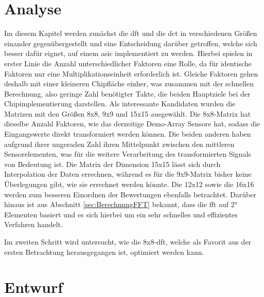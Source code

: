  
 
 
 
 
\chapter{Analyse}
Im diesem Kapitel werden zunächst die \gls{dft} und die \gls{dct} in verschiedenen Größen einander gegenübergestellt und eine Entscheidung darüber getroffen, welche
sich besser dafür eignet, auf einem \gls{asic} implementiert zu werden. Hierbei spielen in erster Linie die Anzahl unterschiedlicher Faktoren eine Rolle, 
da für identische Faktoren nur eine Multiplikationseinheit erforderlich ist. Gleiche Faktoren gehen deshalb mit einer kleineren Chipfläche einher, was zusammen mit der schnellen 
Berechnung, also geringe Zahl benötigter Takte, die beiden Hauptziele bei der Chipimplementierung darstellen.
Als interessante Kandidaten wurden die Matrizen mit den Größen 8x8, 9x9 und 15x15 ausgewählt. 
Die 8x8-Matrix hat dieselbe Anzahl Faktoren, wie das derzeitige Demo-Array Sensore hat, sodass die Eingangswerte direkt transformiert werden können. 
Die beiden anderen haben aufgrund ihrer ungeraden Zahl ihren Mittelpunkt zwischen den mittleren Sensorelementen, was für die 
weitere Verarbeitung des transformierten Signals von Bedeutung ist. Die Matrix der Dimension 15x15 lässt sich durch Interpolation der Daten errechnen, während es für
die 9x9-Matrix bisher keine Überlegungen gibt, wie sie errechnet werden könnte.
Die 12x12 sowie die 16x16 werden zum besseren Einordnen der Bewertungen ebenfalls betrachtet.
Darüber hinaus ist aus Abschnitt \ref{sec:BerechnungFFT} bekannt, dass die \gls{fft} auf 2$^n$ Elementen basiert und es sich hierbei um ein sehr schnelles und 
effizientes Verfahren handelt. 

Im zweiten Schritt wird untersucht, wie die 8x8-\gls{dft}, welche als Favorit aus der ersten Betrachtung herausgegangen ist, optimiert werden kann.


 
 
 
 

 
 
 
\chapter{Entwurf}

 

 
 
 
 
